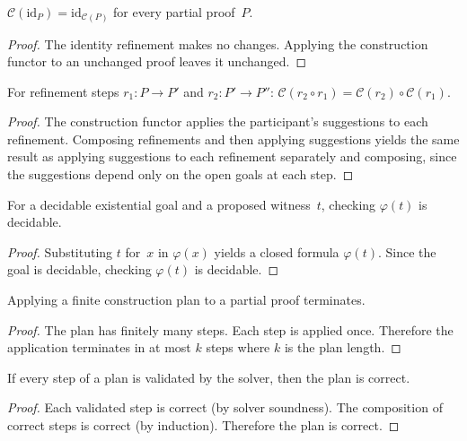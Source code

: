 \documentclass[11pt]{article}
\begin{document}
\begin{lemma}%
\label{lem:confuncid}
$\mathcal{C}(\mathrm{id}_P) = \mathrm{id}_{\mathcal{C}(P)}$
for every partial proof~$P$.
\end{lemma}
\begin{proof}
The identity refinement makes no changes.  Applying the
construction functor to an unchanged proof leaves it unchanged.
\end{proof}

\begin{lemma}%
\label{lem:confunccomp}
For refinement steps $r_1 \colon P \to P'$ and
$r_2 \colon P' \to P''$:
$\mathcal{C}(r_2 \circ r_1) = \mathcal{C}(r_2) \circ \mathcal{C}(r_1)$.
\end{lemma}
\begin{proof}
The construction functor applies the participant's suggestions
to each refinement.  Composing refinements and then applying
suggestions yields the same result as applying suggestions to
each refinement separately and composing, since the suggestions
depend only on the open goals at each step.
\end{proof}

\begin{lemma}%
\label{lem:witdecid}
For a decidable existential goal and a proposed witness~$t$,
checking $\varphi(t)$ is decidable.
\end{lemma}
\begin{proof}
Substituting $t$ for~$x$ in $\varphi(x)$ yields a closed
formula $\varphi(t)$.  Since the goal is decidable, checking
$\varphi(t)$ is decidable.
\end{proof}

\begin{lemma}%
\label{lem:planterm}
Applying a finite construction plan to a partial proof
terminates.
\end{lemma}
\begin{proof}
The plan has finitely many steps.  Each step is applied
once.  Therefore the application terminates in at most $k$
steps where $k$ is the plan length.
\end{proof}

\begin{lemma}%
\label{lem:planvalcorrect}
If every step of a plan is validated by the solver, then
the plan is correct.
\end{lemma}
\begin{proof}
Each validated step is correct (by solver soundness).
The composition of correct steps is correct (by induction).
Therefore the plan is correct.
\end{proof}
\end{document}
